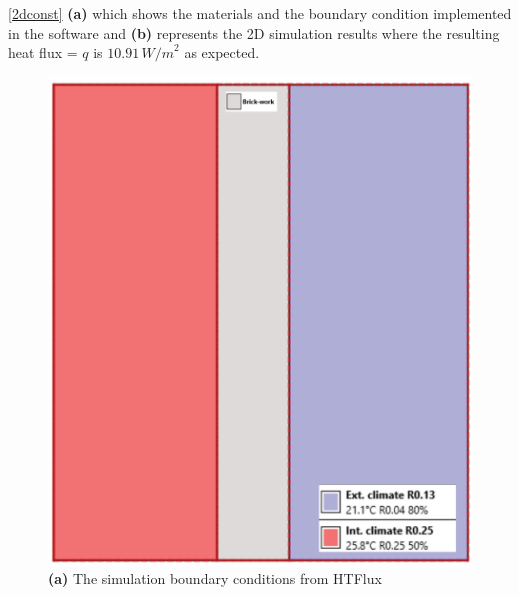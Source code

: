  \ref{2dconst} \textbf{(a)} which shows the materials and the boundary condition implemented in the software and \textbf{(b)} represents the 2D simulation results where the resulting heat flux = \( q \) is \( 10.91 \, {W/m}^2 \) as expected.










\begin{figure}[H]
\begin{minipage}{0.45\textwidth}
  \centering
  \includegraphics[width=\linewidth]{Figures/2dconst.png} 
  \caption*{\textbf{(a)} The simulation boundary conditions from HTFlux}
\end{minipage}%
\hspace{0.1\textwidth}
\begin{minipage}{0.45\textwidth}
  \centering

\end{minipage}
\end{figure}
